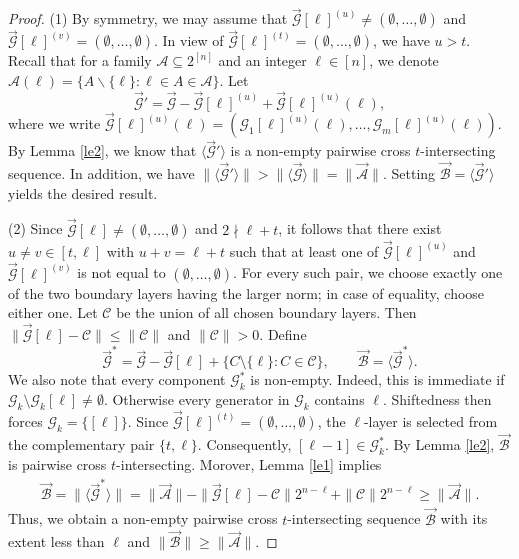 \documentclass[11pt,a4paper]{article}
\begin{document}
\begin{proof}
(1)  By symmetry, we may assume that $\vec{\mathcal{G}}[\ell]^{(u)}\neq (\emptyset,\ldots, \emptyset)$ and $\vec{\mathcal{G}}[\ell]^{(v)}= (\emptyset,\ldots, \emptyset)$.
In view of $\vec{\mathcal{G}}[\ell]^{(t)}=(\emptyset,\ldots,\emptyset)$, we have $u>t$.
Recall that for a family $\mathcal{A}\subseteq 2^{[n]}$ and an integer $\ell \in [n]$, we denote $\mathcal{A}(\ell) = \{A\backslash \{\ell\}: \ell\in A\in \mathcal{A}\}$.
Let  
$$ \vec{\mathcal{G}}'= \vec{\mathcal{G}}- \vec{\mathcal{G}}[\ell]^{(u)}+\vec{\mathcal{G}}[\ell]^{(u)}(\ell),$$
where we write $\vec{\mathcal{G}}[\ell]^{(u)}(\ell)= \left(\mathcal{G}_1[\ell]^{(u)}(\ell),\ldots, \mathcal{G}_m[\ell]^{(u)}(\ell) \right)$. 
By Lemma \ref{le2}, we know that $ \langle\vec{\mathcal{G}}'\rangle$ is a non-empty
pairwise cross $t$-intersecting sequence. In addition, we have $\|\langle\vec{\mathcal{G}}'\rangle\|>\|\langle\vec{\mathcal{G}}\rangle\|=\|\vec{\mathcal{A}}\|$. Setting $\vec{\mathcal{B}}=\langle\vec{\mathcal{G}}'\rangle$ yields the desired result.




(2)   
Since $\vec{\mathcal{G}}[\ell]\neq (\emptyset,\ldots, \emptyset)$  and $2\nmid \ell+t$, it follows  that there exist $u\neq v\in [t,\ell]$ with  $u+v=\ell+t$ such that at least one of $\vec{\mathcal{G}}[\ell]^{(u)}$ and $\vec{\mathcal{G}}[\ell]^{(v)}$ is not equal to  $(\emptyset,\ldots, \emptyset)$. 
For every such pair,  we choose exactly one of the two boundary layers having
the larger norm; in case of equality, choose either one.
Let $\mathcal C$ be the union of all chosen boundary layers.
Then $\|\vec{\mathcal{G}}[\ell]- \mathcal C\|\leq \|\mathcal C\|$ and $ \|\mathcal C\|>0$.
Define 
$$
\vec{\mathcal{G}}^*
=
\vec{\mathcal{G}}-\vec{\mathcal{G}}[\ell]+
\{C\setminus\{\ell\}:C\in\mathcal C\},\qquad \vec{\mathcal{B}}=\langle\vec{\mathcal{G}}^*\rangle.
$$
We also note that every component $\mathcal G_k^{*}$ is non-empty.
Indeed, this is immediate if
$\mathcal G_k\setminus\mathcal G_k[\ell]\ne\emptyset$.
Otherwise every generator in $\mathcal G_k$ contains $\ell$.
Shiftedness then forces $\mathcal G_k=\{[\ell]\}$. Since
$\vec{\mathcal G}[\ell]^{(t)}=(\emptyset,\ldots,\emptyset)$, the
$\ell$-layer is selected from the complementary pair $\{t,\ell\}$.
Consequently, $[\ell-1]\in\mathcal G_k^{*}$.
By  Lemma \ref{le2}, $\vec{\mathcal{B}}$ is pairwise cross $t$-intersecting. 
Morover, Lemma \ref{le1} implies
\begin{align*}
\vec{\mathcal{B}}=\|\langle \vec{\mathcal{G}}^*\rangle\| =\|\vec{\mathcal{A}}\|-\|\vec{\mathcal{G}}[\ell]-\mathcal C\|2^{n-\ell}+\|\mathcal C\|2^{n-\ell}\geq \|\vec{\mathcal{A}}\|.
\end{align*}
Thus, we obtain  a  non-empty pairwise cross $t$-intersecting sequence $\vec{\mathcal{B}}$  with its extent less than $\ell$ and $\|\vec{\mathcal{B}}\|\geq \|\vec{\mathcal{A}}\|$.



\end{proof}
\end{document}
